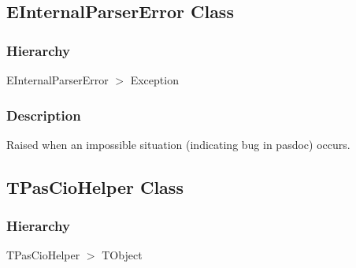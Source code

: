 \documentclass{report}
\newif\ifpdf
\begin{document}
\subsection*{EInternalParserError Class}
\fi
\label{PasDoc_Parser.EInternalParserError}
\subsubsection*{\large{\textbf{Hierarchy}}\normalsize\hspace{1ex}\hfill}
EInternalParserError {$>$} Exception
\subsubsection*{\large{\textbf{Description}}\normalsize\hspace{1ex}\hfill}
Raised when an impossible situation (indicating bug in pasdoc) occurs.\ifpdf
\subsection*{\large{\textbf{TPasCioHelper Class}}\normalsize\hspace{1ex}\hrulefill}
\else
\subsection*{TPasCioHelper Class}
\fi
\label{PasDoc_Parser.TPasCioHelper}
\subsubsection*{\large{\textbf{Hierarchy}}\normalsize\hspace{1ex}\hfill}
TPasCioHelper {$>$} TObject
\end{document}
